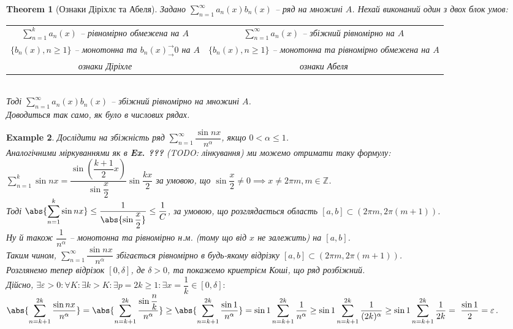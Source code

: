 \documentclass[a4paper, 10pt]{article}
\def\huge{\displaystyle}
\theoremstyle{theoremdd}
\newtheorem{theorem}{Theorem}[subsection]
\theoremstyle{theoremdd}
\theoremstyle{theoremdd}
\theoremstyle{theoremdd}
\theoremstyle{theoremdd}
\newtheorem{example}[theorem]{Example}
\theoremstyle{theoremdd}
\theoremstyle{theoremdd}
\theoremstyle{theoremdd}
\theoremstyle{theoremdd}
\begin{document}
\begin{theorem}[Ознаки Діріхлє та Абеля]
Задано  $\huge \sum_{n=1}^\infty a_n(x) b_n(x)$ -- ряд на множині $A$. Нехай виконаний один з двох блок умов:\\
\begin{tabular}{c | c}
$\huge\sum_{n=1}^k a_n(x)$ -- рівномірно обмежена на $A$ & $\huge \sum_{n=1}^{\infty} a_n(x)$ -- збіжний рівномірно на $A$ \\
$\{b_n(x), n \geq 1\}$ -- монотонна та $b_n(x)^\rightarrow_\rightarrow 0$ на $A$ & $\{b_n(x), n \geq 1\}$ -- монотонна та рівномірно обмежена на $A$\\
\textit{ознаки Діріхле} & \textit{ознаки Абеля}
\end{tabular}\\
Тоді $\huge \sum_{n=1}^{\infty} a_n(x) b_n(x)$ -- збіжний рівномірно на множині $A$.\\
\textit{Доводиться так само, як було в числових рядах.}
\end{theorem}

\begin{example}
Дослідити на збіжність ряд $\huge\sum_{n=1}^\infty \dfrac{\sin nx}{n^\alpha}$, якщо $0 < \alpha \leq 1$.\\
Аналогічними міркуваннями як в \textbf{Ex. ???} (TODO: лінкування) ми можемо отримати таку формулу:\\
$\huge\sum_{n=1}^k \sin nx = \dfrac{\sin \left(\dfrac{k+1}{2}x \right)}{\sin \dfrac{x}{2}} \sin \dfrac{kx}{2}$ за умовою, що $\sin \dfrac{x}{2} \neq 0 \implies x \neq 2 \pi m, m \in \mathbb{Z}$.\\
Тоді $\abs{\huge\sum_{n=1}^k \sin n x} \leq \dfrac{1}{\abs{\sin \dfrac{x}{2}}} \leq \dfrac{1}{C}$, за умовою, що розглядається область $[a,b] \subset (2\pi m, 2 \pi (m+1))$.\\
Ну й також $\dfrac{1}{n^\alpha}$ -- монотонна та рівномірно н.м. (тому що від $x$ не залежить) на $[a,b]$.\\
Таким чином, $\huge\sum_{n=1}^\infty \dfrac{\sin nx}{n^\alpha}$ збігається рівномірно в будь-якому відрізку $[a,b] \subset (2\pi m, 2 \pi (m+1))$.
\bigskip \\
Розглянемо тепер відрізок $[0,\delta]$, де $\delta > 0$, та покажемо криетрієм Коші, що ряд розбіжний.\\
Дійсно, $\exists \varepsilon > 0: \forall K: \exists k > K: \exists p = 2k \geq 1: \exists x = \dfrac{1}{k} \in [0,\delta]:$\\
$\huge\abs{\sum_{n=k+1}^{2k} \dfrac{\sin nx}{n^\alpha}} =\abs{\sum_{n=k+1}^{2k} \dfrac{\sin \dfrac{n}{k}}{n^\alpha}} \geq \abs{\sum_{n=k+1}^{2k} \dfrac{\sin 1}{n^\alpha}} = \sin 1 \sum_{n=k+1}^{2k} \dfrac{1}{n^\alpha} \geq \sin 1 \sum_{n=k+1}^{2k} \dfrac{1}{(2k)^\alpha} \geq \sin 1\sum_{n=k+1}^{2k} \dfrac{1}{2k} = ~{\dfrac{\sin 1}{2} = \varepsilon}$.
\end{example}
\end{document}

